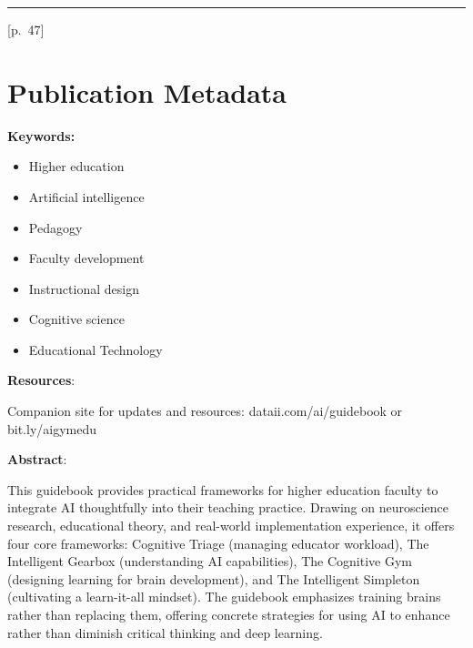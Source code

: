 \documentclass[
  letterpaper,
  DIV=11,
  numbers=noendperiod]{scrreprt}
\providecommand{\tightlist}{%
  \setlength{\itemsep}{0pt}\setlength{\parskip}{0pt}}
\begin{document}
\begin{center}\rule{0.5\linewidth}{0.5pt}\end{center}

{[}p.~47{]}


\chapter{Publication Metadata}\label{publication-metadata}

\textbf{Keywords:}

\begin{itemize}
\tightlist
\item
  Higher education
\item
  Artificial intelligence
\item
  Pedagogy
\item
  Faculty development
\item
  Instructional design
\item
  Cognitive science
\item
  Educational Technology
\end{itemize}

\textbf{Resources}:

Companion site for updates and resources: dataii.com/ai/guidebook or
bit.ly/aigymedu

\textbf{Abstract}:

This guidebook provides practical frameworks for higher education
faculty to integrate AI thoughtfully into their teaching practice.
Drawing on neuroscience research, educational theory, and real-world
implementation experience, it offers four core frameworks: Cognitive
Triage (managing educator workload), The Intelligent Gearbox
(understanding AI capabilities), The Cognitive Gym (designing learning
for brain development), and The Intelligent Simpleton (cultivating a
learn-it-all mindset). The guidebook emphasizes training brains rather
than replacing them, offering concrete strategies for using AI to
enhance rather than diminish critical thinking and deep learning.
\end{document}
